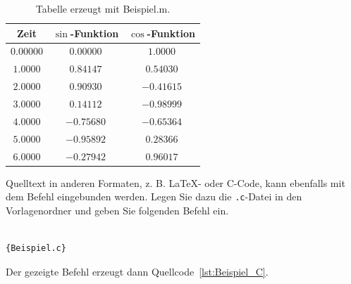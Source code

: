 \begin{table}[htb]
    \centering
    \caption{Tabelle erzeugt mit Beispiel.m.}
    \label{tab:Beispieltabelle}
    \begin{tabular}{ccc}
        \toprule
        Zeit & $\sin$-Funktion & $\cos$-Funktion\\
        \midrule
        $0.00000$ & $0.00000$ & $1.0000$ \\
        $1.0000$ & $0.84147$ & $0.54030$ \\
        $2.0000$ & $0.90930$ & $-0.41615$ \\
        $3.0000$ & $0.14112$ & $-0.98999$ \\
        $4.0000$ & $-0.75680$ & $-0.65364$ \\
        $5.0000$ & $-0.95892$ & $0.28366$ \\
        $6.0000$ & $-0.27942$ & $0.96017$ \\
        \bottomrule
    \end{tabular}
\end{table}

Quelltext in anderen Formaten, z. B. \LaTeX- oder C-Code, kann ebenfalls mit dem Befehl \verb|| eingebunden werden. Legen Sie dazu die \verb|.c|-Datei in den Vorlagenordner und geben Sie folgenden Befehl ein.
\begin{verbatim}

{Beispiel.c}
\end{verbatim}
Der gezeigte Befehl erzeugt dann Quellcode~\ref{lst:Beispiel_C}.
